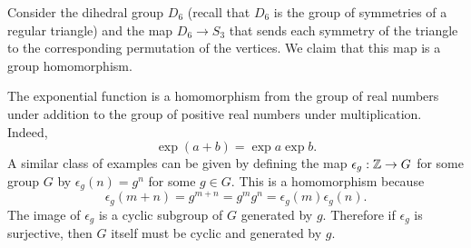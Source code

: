 \begin{example}
    Consider the dihedral group \(D_6\) (recall that \(D_6\) is the group of
    symmetries of a regular triangle) and the map \(D_6 \to S_3\) that sends
    each symmetry of the triangle to the corresponding permutation of the
    vertices. We claim that this map is a group homomorphism.
\end{example}

\begin{example}
    The exponential function is a homomorphism from the group of real numbers
    under addition to the group of positive real numbers under multiplication.
    Indeed,
    \[
        \exp (a + b) = \exp a \exp b.
    \]
    A similar class of examples can be given by defining the map \(\epsilon_g :
    \mathbb{Z} \to G\) for some group \(G\) by \(\epsilon_g(n) = g^n\) for some \(g \in
    G\). This is a homomorphism because
    \[
        \epsilon_g(m + n) = g^{m + n} = g^m g^n = \epsilon_g(m) \epsilon_g(n).
    \]
    The image of \(\epsilon_g\) is a cyclic subgroup of \(G\) generated by
    \(g\). Therefore if \(\epsilon_g\) is surjective, then \(G\) itself must be
    cyclic and generated by \(g\).
\end{example}

